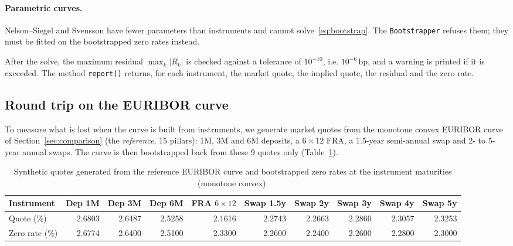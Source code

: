 \documentclass[11pt,a4paper]{article}
\theoremstyle{plain}
\theoremstyle{definition}
\newcommand{\bp}{\,\mathrm{bp}}
\begin{document}
\paragraph{Parametric curves.} Nelson--Siegel and Svensson have fewer parameters than instruments and cannot solve~\eqref{eq:bootstrap}. The \texttt{Bootstrapper} refuses them; they must be fitted on the bootstrapped zero rates instead.

After the solve, the maximum residual $\max_k|R_k|$ is checked against a tolerance of $10^{-10}$, i.e. $10^{-6}\bp$, and a warning is printed if it is exceeded. The method \texttt{report()} returns, for each instrument, the market quote, the implied quote, the residual and the zero rate.

\subsection{Round trip on the EURIBOR curve}
To measure what is lost when the curve is built from instruments, we generate market quotes from the monotone convex EURIBOR curve of Section~\ref{sec:comparison} (the \emph{reference}, 15 pillars): 1M, 3M and 6M deposits, a $6\times12$ FRA, a 1.5-year semi-annual swap and 2- to 5-year annual swaps. The curve is then bootstrapped back from these 9 quotes only (Table~\ref{tab:quotes}).

\begin{table}[htbp]
\centering
\footnotesize
\setlength{\tabcolsep}{3pt}
\begin{tabular}{@{}lrrrrrrrrr@{}}
\toprule
Instrument & Dep 1M & Dep 3M & Dep 6M & FRA $6\times12$ & Swap 1.5y & Swap 2y & Swap 3y & Swap 4y & Swap 5y \\
\midrule
Quote (\%) & 2.6803 & 2.6487 & 2.5258 & 2.1616 & 2.2743 & 2.2663 & 2.2860 & 2.3057 & 2.3253 \\
Zero rate (\%) & 2.6774 & 2.6400 & 2.5100 & 2.3300 & 2.2600 & 2.2400 & 2.2600 & 2.2800 & 2.3000 \\
\bottomrule
\end{tabular}
\caption{Synthetic quotes generated from the reference EURIBOR curve and bootstrapped zero rates at the instrument maturities (monotone convex).}
\label{tab:quotes}
\end{table}
\end{document}
